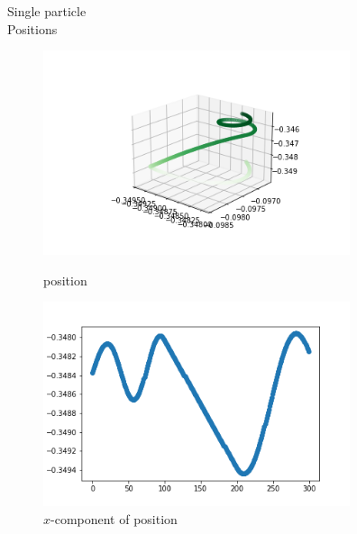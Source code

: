 \documentclass[12pt]{article}
\begin{document}
	Single particle \\
	Positions 
	\begin{figure}[H]
		\begin{multicols}{2}
			\includegraphics[width=\linewidth, height=6cm]{ps3.png} \caption{position} \label{ps3} \par
			\includegraphics[width=\linewidth, height=6cm]{psx3.png} \caption{$x$-component of position} \label{psx3} \par
		\end{multicols}
	\end{figure}
\end{document}
